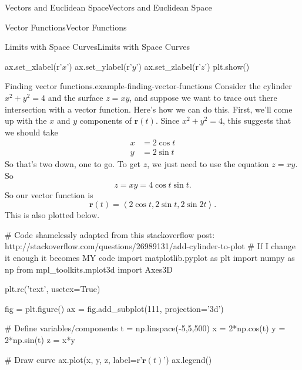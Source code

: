 \documentclass[10pt,]{book}
\numberwithin{equation}{section}
\newcommand{\vv}[1]{\mathbf{#1}}
\newcommand{\dotprod}[1]{\left\langle #1 \right\rangle}
\begin{document}
\begin{chapterptx}{Vectors and Euclidean Space}{}{Vectors and Euclidean Space}{}{}
\begin{sectionptx}{Vector Functions}{}{Vector Functions}{}{}
\begin{subsectionptx}{Limits with Space Curves}{}{Limits with Space Curves}{}{}
\begin{sageinput}
ax.set_xlabel(r'$x$')
ax.set_ylabel(r'$y$')
ax.set_zlabel(r'$z$')
plt.show()
\end{sageinput}
\begin{example}{Finding vector functions.}{example-finding-vector-functions}%
\hypertarget{p-1041}{}%
Consider the cylinder \(x^{2}+y^{2}=4\) and the surface \(z=xy\), and suppose we want to trace out there intersection with a vector function. Here's how we can do this. First, we'll come up with the \(x\) and \(y\) components of \(\vv{r}(t)\). Since \(x^{2}+y^{2} = 4\), this suggests that we should take%
%
\begin{align*}
x & = 2\cos t \\
y & = 2\sin t 
\end{align*}
\hypertarget{p-1042}{}%
So that's two down, one to go. To get \(z\), we just need to use the equation \(z=xy\). So%
%
\begin{equation*}
z = xy = 4\cos t\sin t.
\end{equation*}
\hypertarget{p-1043}{}%
So our vector function is%
%
\begin{equation*}
\vv{r}(t) = \dotprod{2\cos t, 2\sin t, 2\sin 2t}.
\end{equation*}
\hypertarget{p-1044}{}%
This is also plotted below.%
\end{example}
\begin{sageinput}
# Code shamelessly adapted from this stackoverflow post: http://stackoverflow.com/questions/26989131/add-cylinder-to-plot
# If I change it enough it becomes MY code
import matplotlib.pyplot as plt
import numpy as np
from mpl_toolkits.mplot3d import Axes3D

plt.rc('text', usetex=True)

fig = plt.figure()
ax = fig.add_subplot(111, projection='3d')

# Define variables/components
t = np.linspace(-5,5,500)
x = 2*np.cos(t)
y = 2*np.sin(t)
z = x*y

# Draw curve
ax.plot(x, y, z, label=r'$\mathbf{r}(t)$')
ax.legend()


\end{sageinput}
\end{subsectionptx}
\end{sectionptx}
\end{chapterptx}
\end{document}
